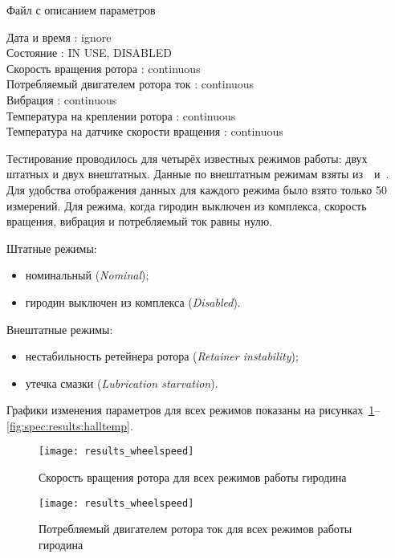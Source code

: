 \begin{algorithm}[h]
\caption{Файл с описанием параметров}
\label{lst:spec:results:params}
\raggedright
\addtolength{\leftskip}{5mm}
\smallskip
Дата и время : ignore \\
Состояние : IN USE, DISABLED \\
Скорость вращения ротора : continuous \\
Потребляемый двигателем ротора ток : continuous \\
Вибрация : continuous \\
Температура на креплении ротора : continuous \\
Температура на датчике скорости вращения : continuous \\
\end{algorithm}

Тестирование проводилось для четырёх известных режимов работы: двух штатных и двух внештатных. Данные по внештатным режимам взяты из~\cite{ISSCMGFailureAnalysis}~и~\cite{ISSCMGLessonsLearned}. Для удобства отображения данных для каждого режима было взято только 50 измерений. Для режима, когда гиродин выключен из комплекса, скорость вращения, вибрация и потребляемый ток равны нулю.

Штатные режимы:
\begin{itemize}
	\item номинальный (\textit{Nominal});
	\item гиродин выключен из комплекса (\textit{Disabled}).
\end{itemize}

Внештатные режимы:
\begin{itemize}
	\item нестабильность ретейнера ротора (\textit{Retainer instability});
	\item утечка смазки (\textit{Lubrication starvation}).
\end{itemize}

Графики изменения параметров для всех режимов показаны на рисунках~\ref{fig:spec:results:wheelspeed}--\ref{fig:spec:results:halltemp}.

\begin{figure}[h]
\texttt{[image: results\_wheelspeed]}
\caption{Скорость вращения ротора для всех режимов работы гиродина}
\label{fig:spec:results:wheelspeed}
\end{figure}

\begin{figure}[h]
\texttt{[image: results\_wheelspeed]}
\caption{Потребляемый двигателем ротора ток для всех режимов работы гиродина}
\label{fig:spec:results:current}
\end{figure}

